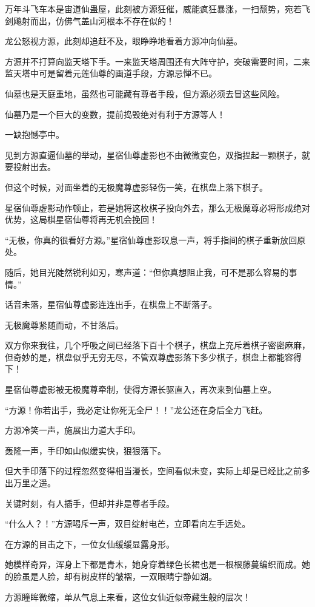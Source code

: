 \begin{this_body}
万年斗飞车本是宙道仙蛊屋，此刻被方源狂催，威能疯狂暴涨，一扫颓势，宛若飞剑飚射而出，仿佛气盖山河根本不存在似的！

龙公怒视方源，此刻却追赶不及，眼睁睁地看着方源冲向仙墓。

方源并不打算向监天塔下手。一来监天塔周围还有大阵守护，突破需要时间，二来监天塔中可是留着元莲仙尊的画道手段，方源忌惮不已。

仙墓也是天庭重地，虽然也可能藏有尊者手段，但方源必须去冒这些风险。

仙墓乃是一个巨大的变数，提前捣毁绝对有利于方源等人！

一缺抱憾亭中。

见到方源直逼仙墓的举动，星宿仙尊虚影也不由微微变色，双指捏起一颗棋子，就要投射出去。

但这个时候，对面坐着的无极魔尊虚影轻伤一笑，在棋盘上落下棋子。

星宿仙尊虚影动作顿止，若是她将这枚棋子投向外去，那么无极魔尊必将形成绝对优势，这局棋星宿仙尊将再无机会挽回！

“无极，你真的很看好方源。”星宿仙尊虚影叹息一声，将手指间的棋子重新放回原处。

随后，她目光陡然锐利如刃，寒声道：“但你真想阻止我，可不是那么容易的事情。”

话音未落，星宿仙尊虚影连连出手，在棋盘上不断落子。

无极魔尊紧随而动，不甘落后。

双方你来我往，几个呼吸之间已经落下百十个棋子，棋盘上充斥着棋子密密麻麻，但奇妙的是，棋盘似乎无穷无尽，不管双尊虚影落下多少棋子，棋盘上都能容得下！

星宿仙尊虚影被无极魔尊牵制，使得方源长驱直入，再次来到仙墓上空。

“方源！你若出手，我必定让你死无全尸！！”龙公还在身后全力飞赶。

方源冷笑一声，施展出力道大手印。

轰隆一声，手印如山似缓实快，狠狠落下。

但大手印落下的过程忽然变得相当漫长，空间看似未变，实际上却是已经比之前多出万里之遥。

关键时刻，有人插手，但却并非是尊者手段。

“什么人？！”方源喝斥一声，双目绽射电芒，立即看向左手远处。

在方源的目击之下，一位女仙缓缓显露身形。

她模样奇异，浑身上下都是青木，她身穿着绿色长裙也是一根根藤蔓编织而成。她的脸虽是人脸，却有树皮样的皱褶，一双眼睛宁静如湖。

方源瞳眸微缩，单从气息上来看，这位女仙近似帝藏生般的层次！


\end{this_body}
